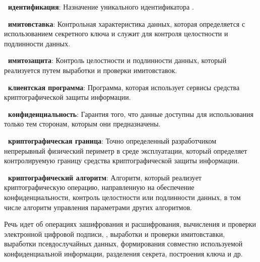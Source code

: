 
{\bf \thedefctr~идентификация}:
Назначение уникального идентификатора
.


{\bf \thedefctr~имитовставка}:
Контрольная характеристика данных, которая определяется с использованием
секретного ключа и служит для контроля целостности и подлинности данных.

{\bf \thedefctr~имитозащита}:
Контроль целостности и подлинности данных, который реализуется путем выработки и
проверки имитовставок.

{\bf \thedefctr~клиентская программа}:
Программа, которая использует сервисы средства криптографической защиты 
информации. 


{\bf \thedefctr~конфиденциальность}:
Гарантия того, что данные доступны для использования
только тем сторонам, которым они предназначены.

{\bf \thedefctr~криптографическая граница}: 
Точно определенный разработчиком непрерывный физический периметр в среде
эксплуатации, который определяет контролируемую границу средства
криптографической защиты информации.


{\bf \thedefctr~криптографический алгоритм}:
Алгоритм, который реализует криптографическую операцию, направленную на
обеспечение конфиденциальности, контроль целостности или подлинности данных, в
том числе алгоритм управления параметрами других алгоритмов.

\begin{note}
Речь идет об операциях зашифрования и расшифрования, вычисления и проверки
электронной цифровой подписи, , выработки и проверки 
имитовставки, выработки псевдослучайных данных, формирования совместно 
используемой конфиденциальной информации, разделения секрета, 
построения ключа и др. 
\end{note}


